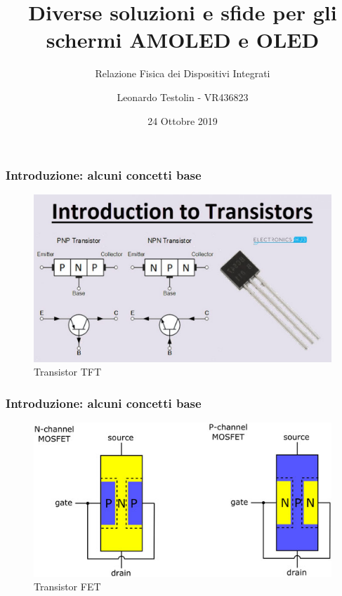 \documentclass[12pt]{beamer}
\begin{document}
	\author{Leonardo Testolin - VR436823}
	\title{Diverse soluzioni e sfide per gli schermi AMOLED e OLED}
	\subtitle{Relazione Fisica dei Dispositivi Integrati}
	\date{24 Ottobre 2019}
	\begin{frame}[plain]
		\maketitle
	\end{frame}
	
	\begin{frame}
		\frametitle{Introduzione: alcuni concetti base}
		\begin{figure}
			\centering
			\includegraphics[width=1\linewidth]{IMMAGINI/TFT_tras}
			\caption{Transistor TFT}
			\label{fig:tfttras}
		\end{figure}
	\end{frame}
	\begin{frame}
		\frametitle{Introduzione: alcuni concetti base}
		\begin{figure}
			\centering
			\includegraphics[width=1\linewidth]{IMMAGINI/FET_DET}
			\caption{Transistor FET}
			\label{fig:fetdet}
		\end{figure}
	\end{frame}
\end{document}
